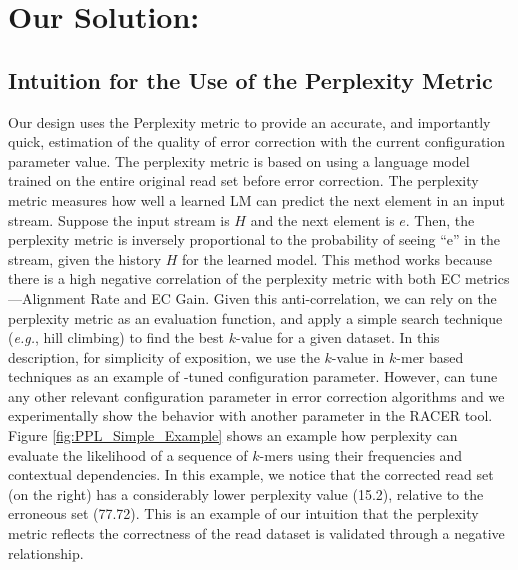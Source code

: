 \section{Our Solution: {\bf \name}}
\subsection{Intuition for the Use of the Perplexity Metric}
Our design uses the Perplexity metric to provide an accurate, and importantly quick, estimation of the quality of error correction with the current configuration parameter value. %
The perplexity metric is based on using a language model trained on the entire original read set before error correction.
The perplexity metric measures how well a learned LM can predict the next element in an input stream. Suppose the input stream is $H$ and the next element is $e$. Then, the perplexity metric is inversely proportional to the probability of seeing ``e'' in the stream, given the history $H$ for the learned model.
This method works because there is a high negative correlation of the perplexity metric with both EC metrics---Alignment Rate and EC Gain.
Given this anti-correlation, we can rely on the perplexity metric as an evaluation function, and apply a simple search technique (\textit{e.g.}, hill climbing) to find the best $k$-value for a given dataset. In this description, for simplicity of exposition, we use the $k$-value in $k$-mer based techniques as an example of \name-tuned configuration parameter. However, \name can tune any other relevant configuration parameter in error correction algorithms and we experimentally show the behavior with another parameter in the RACER tool. 
Figure \ref{fig:PPL_Simple_Example} shows an example how perplexity can evaluate the likelihood of a sequence of $k$-mers using their frequencies and contextual dependencies. In this example, we notice that the corrected read set (\ie on the right) has a considerably lower perplexity value (15.2), relative to the erroneous set (77.72). This is an example of our intuition that the perplexity metric reflects the correctness of the read dataset is validated through a negative relationship.

